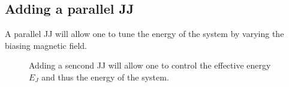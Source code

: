 \subsection{Adding a parallel JJ\label{subsec:cpb_2}}
\begin{framed}\noindent
  A parallel JJ  will allow one to  tune the energy of  the system by
  varying the biasing magnetic field.
\end{framed}

\begin{figure}[h]
  \centering {}
  \caption{\small Adding a  sencond JJ will allow one  to control the
    effective   energy   $E_{J}$  and   thus   the   energy  of   the
    system.\label{fig:cooper_pair_box_3_tuneable}}
\end{figure}

